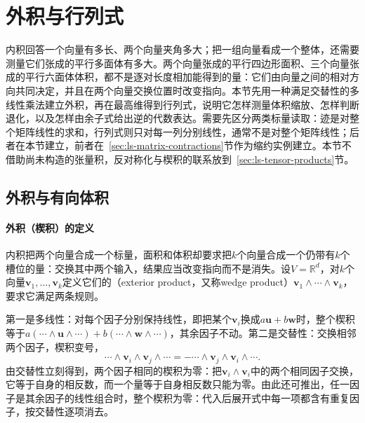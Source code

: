 
\section{外积与行列式}
\label{sec:ls-exterior-determinants}
\label{sec:linear-algebra-scalar-readouts}

内积回答一个向量有多长、两个向量夹角多大；把一组向量看成一个整体，还需要测量它们张成的平行多面体有多大。两个向量张成的平行四边形面积、三个向量张成的平行六面体体积，都不是逐对长度相加能得到的量：它们由向量之间的相对方向共同决定，并且在两个向量交换位置时改变指向。本节先用一种满足交替性的多线性乘法建立外积，再在最高维得到行列式，说明它怎样测量体积缩放、怎样判断退化，以及怎样由余子式给出逆的代数表达。需要先区分两类标量读取：迹是对整个矩阵线性的求和，行列式则只对每一列分别线性，通常不是对整个矩阵线性；后者在本节建立，前者在~\ref{sec:ls-matrix-contractions}节作为缩约实例建立。本节不借助尚未构造的张量积，反对称化与楔积的联系放到~\ref{sec:ls-tensor-products}节。

\subsection{外积与有向体积}

\paragraph{外积（楔积）的定义}

内积把两个向量合成一个标量，面积和体积却要求把$k$个向量合成一个仍带有$k$个槽位的量：交换其中两个输入，结果应当改变指向而不是消失。设$V=\mathbb R^d$，对$k$个向量$\bm v_1,\ldots,\bm v_k$定义它们的（exterior product，又称wedge product）$\bm v_1\wedge\cdots\wedge\bm v_k$，要求它满足两条规则。

第一是多线性：对每个因子分别保持线性，即把某个$\bm v_i$换成$a\bm u+b\bm w$时，整个楔积等于$a(\cdots\wedge\bm u\wedge\cdots)+b(\cdots\wedge\bm w\wedge\cdots)$，其余因子不动。第二是交替性：交换相邻两个因子，楔积变号，
\[
 \cdots\wedge\bm v_i\wedge\bm v_j\wedge\cdots
 =-\cdots\wedge\bm v_j\wedge\bm v_i\wedge\cdots.
\]
由交替性立刻得到，两个因子相同的楔积为零：把$\bm v_i\wedge\bm v_i$中的两个相同因子交换，它等于自身的相反数，而一个量等于自身相反数只能为零。由此还可推出，任一因子是其余因子的线性组合时，整个楔积为零：代入后展开式中每一项都含有重复因子，按交替性逐项消去。

